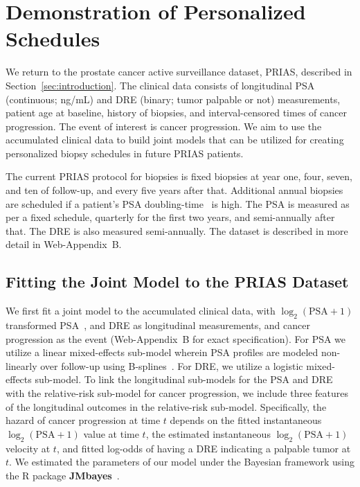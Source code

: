 \section{Demonstration of Personalized Schedules}
\label{sec:results}
We return to the prostate cancer active surveillance dataset, PRIAS, described in Section~\ref{sec:introduction}. The clinical data consists of longitudinal PSA (continuous; ng/mL) and DRE (binary; tumor palpable or not) measurements, patient age at baseline, history of biopsies, and interval-censored times of cancer progression. The event of interest is cancer progression. We aim to use the accumulated clinical data to build joint models that can be utilized for creating personalized biopsy schedules in future PRIAS patients. 

The current PRIAS protocol for biopsies is fixed biopsies at year one, four, seven, and ten of follow-up, and every five years after that. Additional annual biopsies are scheduled if a patient's PSA doubling-time~\citep{bokhorst2015compliance} is high. The PSA is measured as per a fixed schedule, quarterly for the first two years, and semi-annually after that. The DRE is also measured semi-annually. The dataset is described in more detail in Web-Appendix~B.

\subsection{Fitting the Joint Model to the PRIAS Dataset}
We first fit a joint model to the accumulated clinical data, with $\log_2(\mbox{PSA} + 1)$ transformed PSA~\citep{lin2000latent,pearson1994mixed}, and DRE as longitudinal measurements, and cancer progression as the event (Web-Appendix~B for exact specification). For PSA we utilize a linear mixed-effects sub-model wherein PSA profiles are modeled non-linearly over follow-up using B-splines~\citep{de1978practical}. For DRE, we utilize a logistic mixed-effects sub-model. To link the longitudinal sub-models for the PSA and DRE with the relative-risk sub-model for cancer progression, we include three features of the longitudinal outcomes in the relative-risk sub-model. Specifically, the hazard of cancer progression at time $t$ depends on the fitted instantaneous $\log_2(\mbox{PSA} + 1)$ value at time $t$, the estimated instantaneous $\log_2(\mbox{PSA} + 1)$ velocity at $t$, and fitted log-odds of having a DRE indicating a palpable tumor at $t$. We estimated the parameters of our model under the Bayesian framework using the R package \textbf{JMbayes}~\citep{rizopoulosJMbayes}.  

